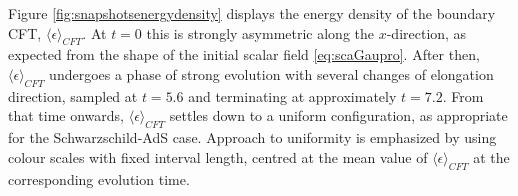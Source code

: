 \documentclass[a4paper,11pt]{article}
\numberwithin{equation}{section}
\begin{document}
Figure \ref{fig:snapshotsenergydensity} displays the energy density of the boundary CFT, $\langle\epsilon\rangle_{CFT}$. At $t=0$ this is strongly asymmetric along the $x$-direction, as expected from the shape of the initial scalar field \eqref{eq:scaGaupro}. After then, $\langle\epsilon\rangle_{CFT}$ undergoes a phase of strong evolution with several changes of elongation direction, sampled at $t=5.6$ and terminating at approximately $t=7.2$. From that time onwards, $\langle\epsilon\rangle_{CFT}$ settles down to a uniform configuration, as appropriate for the Schwarzschild-AdS case. Approach to uniformity is emphasized by using colour scales with fixed interval length, centred at the mean value of $\langle\epsilon\rangle_{CFT}$ at the corresponding evolution time.




\end{document}
